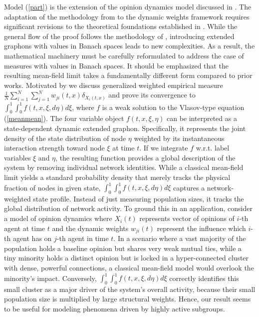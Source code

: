 \documentclass[10pt]{article}
\newcommand{\izj}{\int_{0}^{1}}
\newcommand{\sn}{\frac{1}{N}\sum_{i=1}^N}
\newcommand{\wji}{w_{ji}}
\begin{document}
Model (\ref{part}) is the extension of the opinion dynamics model discussed in \cite{nasza}. The adaptation of the methodology from \cite{nasza} to the dynamic weights framework requires significant revisions to the theoretical foundations established in \cite{JPS2025}. While the general flow of the proof follows the methodology of \cite{JPS2025}, introducing extended graphons with values in Banach spaces leads to new complexities. As a result, the mathematical machinery must be carefully reformulated to address the case of measures with values in Banach spaces. It should be emphasized that the resulting mean-field limit  takes a fundamentally different form compared to prior works. Motivated by \cite{nasza} we discuss generalized weighted empirical measure $\sn \sum_{j=1}^N \wji(t,x)\delta_{X_i(t,x)}$ and prove its convergence to  $\izj \izj f(t,x,\xi,d\eta)d\xi$, where $f$ is a weak solution to the Vlasov-type equation (\ref{meanmean}). 
 The four variable object $f(t,x,\xi,\eta)$ can be interpreted as a state-dependent dynamic extended graphon. Specifically, it represents the joint density of the state distribution of node $\eta$ weighted by its instantaneous interaction strength toward node $\xi$ at time $t$. If we integrate $f$ w.r.t. label variables $\xi$ and $\eta$, the resulting function provides a global description of the system by removing individual network identities. While a classical mean-field limit yields a standard probability density that merely tracks the physical fraction of nodes in given state, $\izj \izj f(t,x,\xi,d\eta)d\xi$ captures a network-weighted state profile. Instead of just measuring population sizes, it tracks the global distribution of network activity. To ground this in an application, consider a model of opinion dynamics where $X_i(t)$ represents vector of opinions of $i$-th agent at time $t$  and the dynamic weights $w_{ji}(t)$ represent the influence which $i$-th agent has on $j$-th agent in time $t$. In a scenario where a vast majority of the population holds a baseline opinion but shares very weak mutual ties, while a tiny minority holds a distinct opinion but is locked in a hyper-connected cluster with dense, powerful connections, a classical mean-field model would overlook the minority's impact. Conversely, $\izj \izj f(t,x,\xi,d\eta)d\xi$ correctly identifies this small cluster as a major driver of the system's overall activity, because their small population size is multiplied by large structural weights. Hence, our result seems to be useful  for modeling phenomena driven by highly active subgroups. \\
\end{document}

